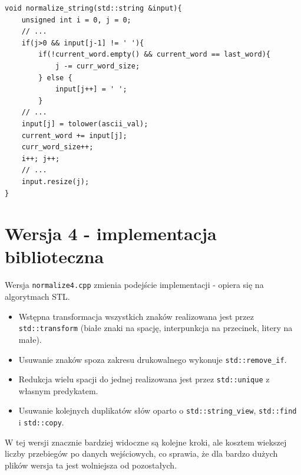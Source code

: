 \documentclass{article}
\begin{document}
\begin{lstlisting}[caption={Kluczowe zmiany w funkcji \texttt{normalize\_string} w wersji 3}]
void normalize_string(std::string &input){
    unsigned int i = 0, j = 0;
    // ...
    if(j>0 && input[j-1] != ' '){
        if(!current_word.empty() && current_word == last_word){
            j -= curr_word_size;
        } else {
            input[j++] = ' ';
        }
    // ...
    input[j] = tolower(ascii_val);
    current_word += input[j];
    curr_word_size++;
    i++; j++;
    // ...
    input.resize(j); 
}
\end{lstlisting}
\newpage
\section{Wersja 4 - implementacja biblioteczna}
Wersja \texttt{normalize4.cpp} zmienia podejście implementacji - opiera się na algorytmach STL.
\begin{itemize}
    \item Wstępna transformacja wszystkich znaków realizowana jest przez \texttt{std::transform} (białe znaki na spację, interpunkcja na przecinek, litery na małe).
    \item Usuwanie znaków spoza zakresu drukowalnego wykonuje \texttt{std::remove\_if}.
    \item Redukcja wielu spacji do jednej realizowana jest przez \texttt{std::unique} z własnym predykatem.
    \item Usuwanie kolejnych duplikatów słów oparto o \texttt{std::string\_view}, \texttt{std::find} i \texttt{std::copy}.
\end{itemize}
W tej wersji znacznie bardziej widoczne są kolejne kroki, ale kosztem wiekszej liczby przebiegów po danych wejściowych, co sprawia, że dla bardzo dużych plików wersja ta jest wolniejsza od pozostałych.
\end{document}
